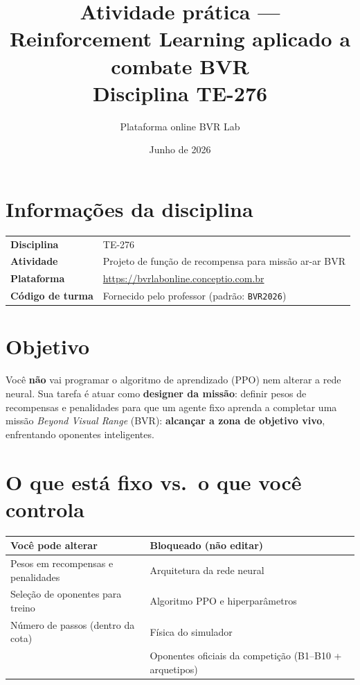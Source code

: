 \documentclass[11pt,a4paper]{article}
\title{\textbf{Atividade prática — Reinforcement Learning aplicado a combate BVR}\\[0.4em]
\large Disciplina TE-276}
\author{Plataforma online BVR Lab}
\date{Junho de 2026}
\begin{document}
\maketitle

\section*{Informações da disciplina}
\begin{tabular}{@{}ll@{}}
  \toprule
  \textbf{Disciplina} & TE-276 \\
  \textbf{Atividade} & Projeto de função de recompensa para missão ar-ar BVR \\
  \textbf{Plataforma} & \url{https://bvrlabonline.conceptio.com.br} \\
  \textbf{Código de turma} & Fornecido pelo professor (padrão: \texttt{BVR2026}) \\
  \bottomrule
\end{tabular}

\section{Objetivo}
Você \textbf{não} vai programar o algoritmo de aprendizado (PPO) nem alterar a rede neural.
Sua tarefa é atuar como \textbf{designer da missão}: definir pesos de recompensas e penalidades
para que um agente fixo aprenda a completar uma missão \emph{Beyond Visual Range} (BVR):
\textbf{alcançar a zona de objetivo vivo}, enfrentando oponentes inteligentes.

\section{O que está fixo vs.\ o que você controla}
\begin{tabular}{@{}p{}p{}@{}}
  \toprule
  \textbf{Você pode alterar} & \textbf{Bloqueado (não editar)} \\
  \midrule
  Pesos em recompensas e penalidades & Arquitetura da rede neural \\
  Seleção de oponentes para treino & Algoritmo PPO e hiperparâmetros \\
  Número de passos (dentro da cota) & Física do simulador \\
  & Oponentes oficiais da competição (B1--B10 + arquetipos) \\
  \bottomrule
\end{tabular}
\end{document}
